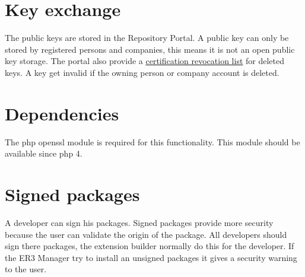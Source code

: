 \section[sec:key exchange]{Key exchange}

The public keys are stored in the Repository Portal.
A public key can only be stored by registered persons and companies, this means it is not an open public key storage.
The portal also provide a \href{http://en.wikipedia.org/wiki/Revocation_list}{certification revocation list} for deleted keys.
A key get invalid if the owning person or company account is deleted.

\section[sec:certificate dependencies]{Dependencies}

The php openssl module is required for this functionality.
This module should be available since php 4.

\section[sec:signed packages]{Signed packages}

A developer can sign his packages.
Signed packages provide more security because the user can validate the origin of the package.
All developers should sign there packages, the extension builder normally do this for the developer.
If the ER3 Manager try to install an unsigned packages it gives a security warning to the user.
